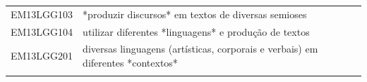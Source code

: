 \documentclass[12pt]{extarticle}
\begin{document}
\begin{longtable}{ll}
EM13LGG103 & *produzir discursos* em textos de diversas semioses                                                                                                                                                                                                                                                                                                                                                                                                                                                                                                                                                                                                                                                                                                                                                                   \\
\rowcolor[HTML]{FFF} 
EM13LGG104 & utilizar diferentes *linguagens* e produção de textos                                                                                                                                                                                                                                                                                                                                                                                                                                                                                                                                                                                                                                                                                                                                                                 \\
\rowcolor[HTML]{E0F7FA} 
EM13LGG201 & diversas linguagens (artísticas, corporais e verbais) em diferentes *contextos*                                                                                                                                                                                                                                                                                                                                                                                                                                                                                                                                                                                                                                                                                                                                       \\
\rowcolor[HTML]{FFF} 

\end{longtable}
\end{document}
